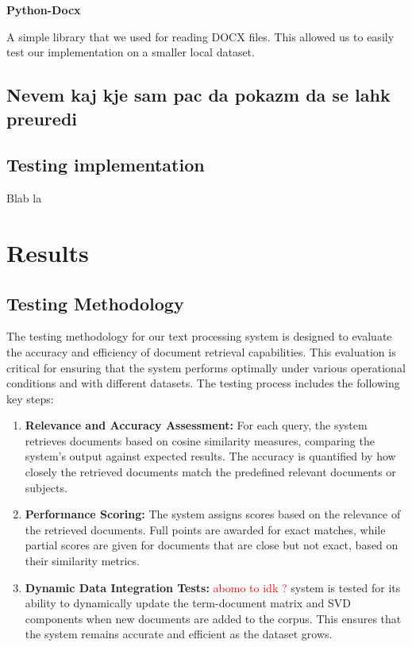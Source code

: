 \documentclass[12pt,a4paper]{article}
\begin{document}
        \bigskip
        \noindent
        \textbf{Python-Docx}

        \noindent
        A simple library that we used for reading DOCX files. This allowed us to easily test our implementation on a smaller local dataset.
    
    \subsection{Nevem kaj kje sam pac da pokazm da se lahk preuredi}

    \newpage
    \subsection{Testing implementation}
    Blab la


\newpage
\section{Results}

\subsection{Testing Methodology}
The testing methodology for our text processing system is designed to evaluate the accuracy and efficiency of document retrieval capabilities. This evaluation is critical for ensuring that the system performs optimally under various operational conditions and with different datasets. The testing process includes the following key steps:

\begin{enumerate}
    \item \textbf{Relevance and Accuracy Assessment:} For each query, the system retrieves documents based on cosine similarity measures, comparing the system’s output against expected results. The accuracy is quantified by how closely the retrieved documents match the predefined relevant documents or subjects.

    \item \textbf{Performance Scoring:} The system assigns scores based on the relevance of the retrieved documents. Full points are awarded for exact matches, while partial scores are given for documents that are close but not exact, based on their similarity metrics.

    \item \textbf{Dynamic Data Integration Tests:} \textcolor{red}{abomo to idk ?} system is tested for its ability to dynamically update the term-document matrix and SVD components when new documents are added to the corpus. This ensures that the system remains accurate and efficient as the dataset grows.
\end{enumerate}
\end{document}
